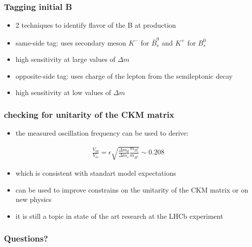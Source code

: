 \documentclass{beamer}
\begin{document}
\begin{frame}
	\frametitle{Tagging initial B}
	\begin{itemize}
		\item 2 techniques to identify flavor of the B at production
		\item same-side tag: uses secondary meson $K^-$ for $\bar{B}^0_s$ and $K^+$ for $B^0_s$
		\item high sensitivity at large values of $\Delta m$
		\item opposite-side tag: uses charge of the lepton from the semileptonic decay
		\item high sensitivity at low values of $\Delta m$
	\end{itemize}
\end{frame}

\begin{frame}
	\frametitle{checking for unitarity of the CKM matrix}
	\begin{itemize}
		\item the measured oscillation frequency can be used to derive:
	\end{itemize}
	\begin{align*}
		\frac{V_{td}}{V_{ts}} = \epsilon \sqrt{\frac{\Delta m_d}{\Delta m_s} \frac{m_{B^0_s}}{m_{B^0}}} \sim 0.208
	\end{align*}
	\begin{itemize}
		\item which is consistent with standart model expectations
		\item can be used to improve constrains on the unitarity of the CKM matrix or on new physics
		\item it is still a topic in state of the art research at the LHCb experiment
	\end{itemize}
\end{frame}


\begin{frame}
	\frametitle{Questions?}
\end{frame}



\end{document}
